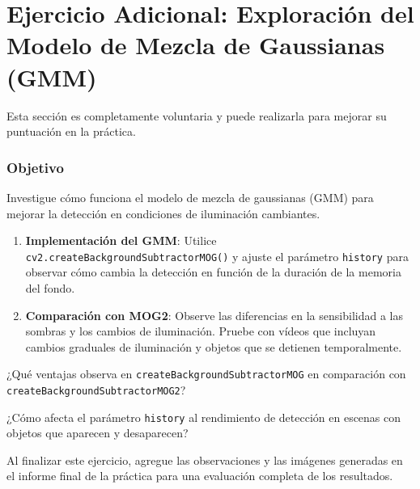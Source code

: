 \chapter{Ejercicio Adicional: \textbf{Exploración del Modelo de Mezcla de Gaussianas (GMM)}}
\label{chapter:tarea_d}

Esta sección es completamente voluntaria y puede realizarla para mejorar su puntuación en la práctica.

\subsection*{Objetivo}
Investigue cómo funciona el modelo de mezcla de gaussianas (GMM) para mejorar la detección en condiciones de iluminación cambiantes.

\begin{enumerate}
    \item \textbf{Implementación del GMM}: Utilice \texttt{cv2.createBackgroundSubtractorMOG()} y ajuste el parámetro \texttt{history} para observar cómo cambia la detección en función de la duración de la memoria del fondo.
    \item \textbf{Comparación con MOG2}: Observe las diferencias en la sensibilidad a las sombras y los cambios de iluminación. Pruebe con vídeos que incluyan cambios graduales de iluminación y objetos que se detienen temporalmente.
\end{enumerate}

\vspace{5mm}
\begin{tcolorbox}[colback=gray!10, colframe=gray!30, coltitle=black, title=Pregunta D.1, halign=left]
¿Qué ventajas observa en \texttt{createBackgroundSubtractorMOG} en comparación con \texttt{createBackgroundSubtractorMOG2}?
\end{tcolorbox}

\vspace{5mm}
\begin{tcolorbox}[colback=gray!10, colframe=gray!30, coltitle=black, title=Pregunta D.2, halign=left]
¿Cómo afecta el parámetro \texttt{history} al rendimiento de detección en escenas con objetos que aparecen y desaparecen?

\vspace{3mm}
Al finalizar este ejercicio, agregue las observaciones y las imágenes generadas en el informe final de la práctica para una evaluación completa de los resultados.
\end{tcolorbox}